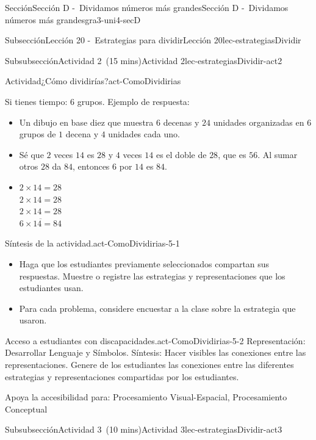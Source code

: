 \documentclass[oneside,10pt,]{article}
\begin{document}
\begin{sectionptx}{Sección}{Sección D -~Dividamos números más grandes}{}{Sección D -~Dividamos números más grandes}{}{}{gra3-uni4-secD}
\begin{subsectionptx}{Subsección}{Lección 20 -~Estrategias para dividir}{}{Lección 20}{}{}{lec-estrategiasDividir}
\begin{subsubsectionptx}{Subsubsección}{Actividad 2~(15 mins)}{}{Actividad 2}{}{}{lec-estrategiasDividir-act2}
\begin{activity}{Actividad}{¿Cómo dividirías?}{act-ComoDividirias}
\begin{enumerate}
\end{enumerate}
Si tienes tiempo: \(6\) grupos. Ejemplo de respuesta:%
%
\begin{itemize}[label=\textbullet]
\item{}Un dibujo en base diez que muestra \(6\) decenas y \(24\) unidades organizadas en \(6\) grupos de \(1\) decena y \(4\) unidades cada uno.%
\item{}Sé que \(2\) veces \(14\) es \(28\) y \(4\) veces \(14\) es el doble de \(28\), que es \(56\). Al sumar otros \(28\) da \(84\), entonces \(6\) por \(14\) es \(84\).%
\item{}\(2 \times 14 = 28\)\\
 \(2 \times 14 = 28\)\\
 \(2 \times 14 = 28\)\\
 \(\overline {6 \times 14 = 84}\)%
\end{itemize}
\end{activity}%
\par
\begin{paragraphs}{Síntesis de la actividad.}{act-ComoDividirias-5-1}%
%
\begin{itemize}[label=\textbullet]
\item{}Haga que los estudiantes previamente seleccionados compartan sus respuestas. Muestre o registre las estrategias y representaciones que los estudiantes usan.%
\item{}Para cada problema, considere encuestar a la clase sobre la estrategia que usaron.%
\end{itemize}
\end{paragraphs}%
\begin{paragraphs}{Acceso a estudiantes con discapacidades.}{act-ComoDividirias-5-2}%
Representación: Desarrollar Lenguaje y Símbolos. Síntesis: Hacer visibles las conexiones entre las representaciones. Genere de los estudiantes las conexiones entre las diferentes estrategias y representaciones compartidas por los estudiantes.%
\par
Apoya la accesibilidad para: Procesamiento Visual-Espacial, Procesamiento Conceptual%
\end{paragraphs}%
\end{subsubsectionptx}
%
%
\typeout{************************************************}
\typeout{************************************************}
%
\begin{subsubsectionptx}{Subsubsección}{Actividad 3~(10 mins)}{}{Actividad 3}{}{}{lec-estrategiasDividir-act3}
\par

\end{subsubsectionptx}
\end{subsectionptx}
\end{sectionptx}
\end{document}
